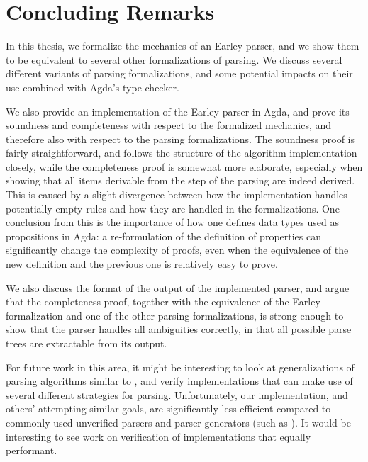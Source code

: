\chapter{Concluding Remarks}\label{Conclusion}

	In this thesis, we formalize the mechanics of an Earley parser, and we show
	them to be equivalent to several other formalizations of parsing. We
	discuss several different variants of parsing formalizations, and some
	potential impacts on their use combined with Agda's type checker.

	We also provide an implementation of the Earley parser in Agda, and prove
	its soundness and completeness with respect to the formalized mechanics,
	and therefore also with respect to the parsing formalizations. The
	soundness proof is fairly straightforward, and follows the structure of the
	algorithm implementation closely, while the completeness proof is somewhat
	more elaborate, especially when showing that all items derivable from the
	 step of the parsing are indeed derived. This is caused by
	a slight divergence between how the implementation handles potentially
	empty rules and how they are handled in the formalizations. One conclusion
	from this is the importance of how one defines data types used as
	propositions in Agda: a re-formulation of the definition of properties can
	significantly change the complexity of proofs, even when the equivalence of
	the new definition and the previous one is relatively easy to prove.

	We also discuss the format of the output of the implemented parser, and
	argue that the completeness proof, together with the equivalence of the
	Earley formalization and one of the other parsing formalizations, is strong
	enough to show that the parser handles all ambiguities correctly, in that
	all possible parse trees are extractable from its output.

	For future work in this area, it might be interesting to look at
	generalizations of parsing algorithms similar to \cite{sikkel97}, and
	verify implementations that can make use of several different strategies
	for parsing. Unfortunately, our implementation, and others' attempting
	similar goals, are significantly less efficient compared to commonly used
	unverified parsers and parser generators (such as \cite{Menhir, Happy,
	Bison}). It would be interesting to see work on verification of
	implementations that equally performant.
